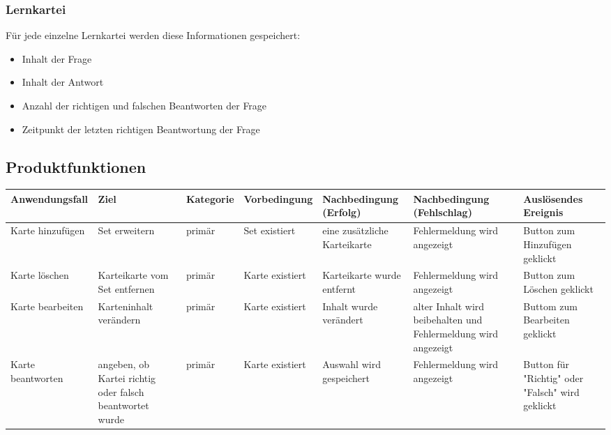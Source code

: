 \subsubsection{Lernkartei}
Für jede einzelne Lernkartei werden diese Informationen gespeichert:
\begin{itemize}
	\item Inhalt der Frage
	\item Inhalt der Antwort
	\item Anzahl der richtigen und falschen Beantworten der Frage
	\item Zeitpunkt der letzten richtigen Beantwortung der Frage
\end{itemize}


\begin{landscape}
\begin{center}
\subsection{Produktfunktionen}


\begin{tabulary}{1.35\textwidth}{|L|L|L|L|L|L|L|}
\hline 
\textbf{Anwendungsfall} & \textbf{Ziel} & \textbf{Kategorie} & \textbf{Vorbedingung} & \textbf{Nachbedingung (Erfolg)} & \textbf{Nachbedingung (Fehlschlag)} & \textbf{Auslösendes Ereignis} \\ 
\hline 
Karte hinzufügen & Set erweitern & primär & Set existiert & eine zusätzliche Karteikarte & Fehlermeldung wird angezeigt & Button zum Hinzufügen geklickt \\ 
\hline 
Karte löschen & Karteikarte vom Set entfernen & primär & Karte existiert & Karteikarte wurde entfernt & Fehlermeldung wird angezeigt & Button zum Löschen geklickt \\ 
\hline 
Karte bearbeiten & Karteninhalt verändern & primär & Karte existiert & Inhalt wurde verändert & alter Inhalt wird beibehalten und Fehlermeldung wird angezeigt & Buttom zum Bearbeiten geklickt \\ 
\hline 
Karte beantworten & angeben, ob Kartei richtig oder falsch beantwortet wurde & primär & Karte existiert & Auswahl wird gespeichert & Fehlermeldung wird angezeigt & Button für "Richtig" oder "Falsch" wird geklickt \\ 
\hline 
\end{tabulary} 
\end{center}
\end{landscape}
\restoregeometry

